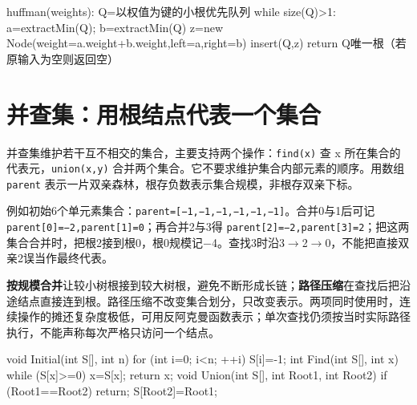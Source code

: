 \par\medskip\noindent\begin{minipage}{\linewidth}
\begin{codeblock}[language={}]
huffman(weights):
    Q=以权值为键的小根优先队列
    while size(Q)>1:
        a=extractMin(Q); b=extractMin(Q)
        z=new Node(weight=a.weight+b.weight,left=a,right=b)
        insert(Q,z)
    return Q唯一根（若原输入为空则返回空）
\end{codeblock}
\end{minipage}\par\medskip

\section{并查集：用根结点代表一个集合}\label{DS05-10}

并查集维护若干互不相交的集合，主要支持两个操作：\texttt{find(\allowbreak{}x)\allowbreak{}} 查 x 所在集合的代表元，\texttt{union(\allowbreak{}x,\allowbreak{}y)\allowbreak{}} 合并两个集合。它不要求维护集合内部元素的顺序。用数组 \texttt{parent} 表示一片双亲森林，根存负数表示集合规模，非根存双亲下标。

例如初始6个单元素集合：\texttt{parent=\allowbreak{}[\allowbreak{}−1,\allowbreak{}−1,\allowbreak{}−1,\allowbreak{}−1,\allowbreak{}−1,\allowbreak{}−1]\allowbreak{}}。合并0与1后可记 \texttt{parent[\allowbreak{}0]\allowbreak{}=\allowbreak{}−2,\allowbreak{}parent[\allowbreak{}1]\allowbreak{}=\allowbreak{}0}；再合并2与3得 \texttt{parent[\allowbreak{}2]\allowbreak{}=\allowbreak{}−2,\allowbreak{}parent[\allowbreak{}3]\allowbreak{}=\allowbreak{}2}；把这两集合合并时，把根2接到根0，根0规模记\ensuremath{-}4。查找3时沿3\ensuremath{\to}2\ensuremath{\to}0，不能把直接双亲2误当作最终代表。

\textbf{按规模合并}让较小树根接到较大树根，避免不断形成长链；\textbf{路径压缩}在查找后把沿途结点直接连到根。路径压缩不改变集合划分，只改变表示。两项同时使用时，连续操作的摊还复杂度极低，可用反阿克曼函数表示；单次查找仍须按当时实际路径执行，不能声称每次严格只访问一个结点。

\par\medskip\noindent\begin{minipage}{\linewidth}
\begin{codeblock}[language=C++]
void Initial(int S[], int n) {
    for (int i=0; i<n; ++i) S[i]=-1;
}
int Find(int S[], int x) {
    while (S[x]>=0) x=S[x];
    return x;
}
void Union(int S[], int Root1, int Root2) {
    if (Root1==Root2) return;
    S[Root2]=Root1;
}
\end{codeblock}
\end{minipage}\par\medskip

